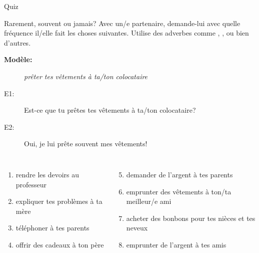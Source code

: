 \documentclass{beamer}
\begin{document}
  \begin{frame}{}
    \begin{center}
      \Large Quiz
    \end{center}
  \end{frame}

  \begin{frame}{Rarement, souvent ou jamais?}
    Avec un/e partenaire, demande-lui avec quelle fréquence il/elle fait les choses suivantes.
    Utilise des adverbes comme , ,  ou bien d'autres.
    \begin{description}
      \item[\textbf{Modèle:}] \emph{prêter tes vêtements à ta/ton colocataire}
      \item[E1:] Est-ce que tu prêtes tes vêtements à ta/ton colocataire?
      \item[E2:] Oui, je lui prête souvent mes vêtements!
    \end{description}
    \begin{columns}[t]
        \begin{enumerate}
          \item rendre les devoirs au professeur
          \item expliquer tes problèmes à ta mère
          \item téléphoner à tes parents
          \item offrir des cadeaux à ton père
        \end{enumerate}
        \begin{enumerate}
          \setcounter{enumi}{4}
          \item demander de l'argent à tes parents
          \item emprunter des vêtements à ton/ta meilleur/e ami
          \item acheter des bonbons pour tes nièces et tes neveux
          \item emprunter de l'argent à tes amis
        \end{enumerate}
    \end{columns}
  \end{frame}
\end{document}
